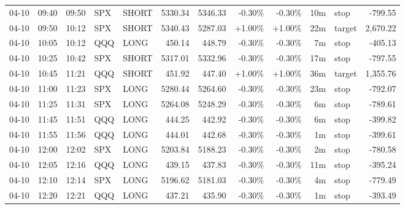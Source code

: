 \documentclass[11pt,a4paper]{article}
\begin{document}
\begin{center}
\begin{longtable}{>{\color{txtmain}}l l l l l r r r r r >{\color{txtmain}}l r}
04-10 & 09:40 & 09:50 & SPX & SHORT & 5330.34 & 5346.33 & \textcolor{lossred}{-0.30\%} & \textcolor{lossred}{-0.30\%} & 10m & stop & \textcolor{lossred}{-799.55} \\
04-10 & 09:50 & 10:12 & SPX & SHORT & 5340.43 & 5287.03 & \textcolor{wingreen}{+1.00\%} & \textcolor{wingreen}{+1.00\%} & 22m & target & \textcolor{wingreen}{2,670.22} \\
04-10 & 10:05 & 10:12 & QQQ & LONG & 450.14 & 448.79 & \textcolor{lossred}{-0.30\%} & \textcolor{lossred}{-0.30\%} & 7m & stop & \textcolor{lossred}{-405.13} \\
04-10 & 10:25 & 10:42 & SPX & SHORT & 5317.01 & 5332.96 & \textcolor{lossred}{-0.30\%} & \textcolor{lossred}{-0.30\%} & 17m & stop & \textcolor{lossred}{-797.55} \\
04-10 & 10:45 & 11:21 & QQQ & SHORT & 451.92 & 447.40 & \textcolor{wingreen}{+1.00\%} & \textcolor{wingreen}{+1.00\%} & 36m & target & \textcolor{wingreen}{1,355.76} \\
04-10 & 11:00 & 11:23 & SPX & LONG & 5280.44 & 5264.60 & \textcolor{lossred}{-0.30\%} & \textcolor{lossred}{-0.30\%} & 23m & stop & \textcolor{lossred}{-792.07} \\
04-10 & 11:25 & 11:31 & SPX & LONG & 5264.08 & 5248.29 & \textcolor{lossred}{-0.30\%} & \textcolor{lossred}{-0.30\%} & 6m & stop & \textcolor{lossred}{-789.61} \\
04-10 & 11:45 & 11:51 & QQQ & LONG & 444.25 & 442.92 & \textcolor{lossred}{-0.30\%} & \textcolor{lossred}{-0.30\%} & 6m & stop & \textcolor{lossred}{-399.82} \\
04-10 & 11:55 & 11:56 & QQQ & LONG & 444.01 & 442.68 & \textcolor{lossred}{-0.30\%} & \textcolor{lossred}{-0.30\%} & 1m & stop & \textcolor{lossred}{-399.61} \\
04-10 & 12:00 & 12:02 & SPX & LONG & 5203.84 & 5188.23 & \textcolor{lossred}{-0.30\%} & \textcolor{lossred}{-0.30\%} & 2m & stop & \textcolor{lossred}{-780.58} \\
04-10 & 12:05 & 12:16 & QQQ & LONG & 439.15 & 437.83 & \textcolor{lossred}{-0.30\%} & \textcolor{lossred}{-0.30\%} & 11m & stop & \textcolor{lossred}{-395.24} \\
04-10 & 12:10 & 12:14 & SPX & LONG & 5196.62 & 5181.03 & \textcolor{lossred}{-0.30\%} & \textcolor{lossred}{-0.30\%} & 4m & stop & \textcolor{lossred}{-779.49} \\
04-10 & 12:20 & 12:21 & QQQ & LONG & 437.21 & 435.90 & \textcolor{lossred}{-0.30\%} & \textcolor{lossred}{-0.30\%} & 1m & stop & \textcolor{lossred}{-393.49} \\

\end{longtable}
\end{center}
\end{document}
